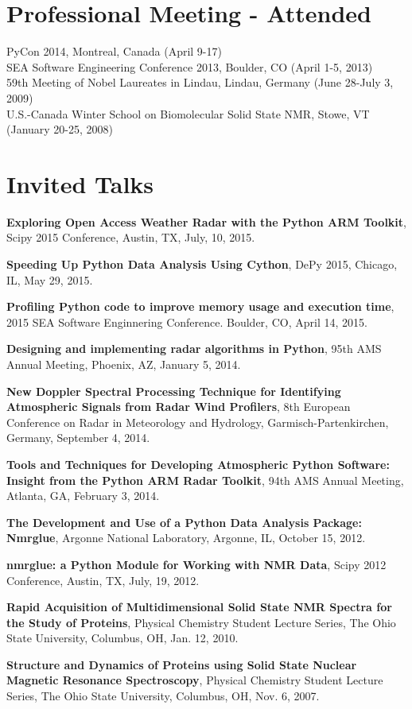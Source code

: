 \documentclass[margin,line]{res}
\begin{document}
\begin{resume}
\section{\sc Professional Meeting - Attended}
PyCon 2014, Montreal, Canada (April 9-17)\\
SEA Software Engineering Conference 2013, Boulder, CO (April 1-5, 2013)\\
59th Meeting of Nobel Laureates in Lindau, Lindau, Germany (June 28-July 3, 2009)\\
U.S.-Canada Winter School on Biomolecular Solid State NMR, Stowe, VT (January 20-25, 2008)\\

\section{\sc Invited Talks}

{\bf Exploring Open Access Weather Radar with the Python ARM Toolkit},
Scipy 2015 Conference, Austin, TX, July, 10, 2015.

{\bf Speeding Up Python Data Analysis Using Cython},
DePy 2015, Chicago, IL, May 29, 2015.

{\bf Profiling Python code to improve memory usage and execution time},
2015 SEA Software Enginnering Conference. Boulder, CO, April 14, 2015.

{\bf Designing and implementing radar algorithms in Python},
95th AMS Annual Meeting, Phoenix, AZ, January 5, 2014.

{\bf New Doppler Spectral Processing Technique for Identifying 
Atmospheric Signals from Radar Wind Profilers},
8th European Conference on Radar in Meteorology and Hydrology, 
Garmisch-Partenkirchen, Germany, September 4, 2014.

{\bf Tools and Techniques for Developing Atmospheric Python Software: 
Insight from the Python ARM Radar Toolkit}, 
94th AMS Annual Meeting, Atlanta, GA, February 3, 2014.

{\bf The Development and Use of a Python Data Analysis Package: Nmrglue},
Argonne National Laboratory, Argonne, IL, October 15, 2012.

{\bf nmrglue: a Python Module for Working with NMR Data}, 
Scipy 2012 Conference, Austin, TX, July, 19, 2012.

{\bf Rapid Acquisition of Multidimensional Solid State NMR Spectra for the Study of 
Proteins}, 
Physical Chemistry Student Lecture Series, The Ohio State University, Columbus, OH, Jan. 12, 2010.

{\bf Structure and Dynamics of Proteins using Solid State Nuclear Magnetic Resonance 
Spectroscopy},
Physical Chemistry Student Lecture Series, The Ohio State University, Columbus, OH, Nov. 6, 2007.

\end{resume}
\end{document}
